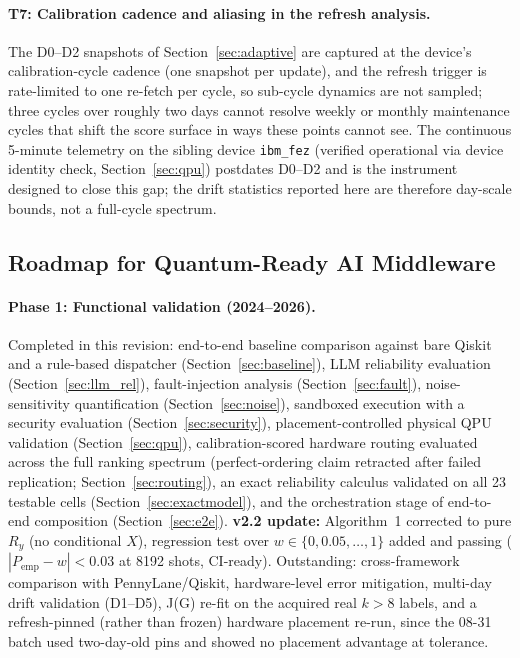 ﻿\documentclass[12pt,a4paper]{article}
\begin{document}
\paragraph{T7: Calibration cadence and aliasing in the refresh analysis.} The D0--D2 snapshots of Section~\ref{sec:adaptive} are captured at the device's calibration-cycle cadence (one snapshot per update), and the refresh trigger is rate-limited to one re-fetch per cycle, so sub-cycle dynamics are not sampled; three cycles over roughly two days cannot resolve weekly or monthly maintenance cycles that shift the score surface in ways these points cannot see. The continuous 5-minute telemetry on the sibling device \texttt{ibm\_fez} (verified operational via device identity check, Section~\ref{sec:qpu}) postdates D0--D2 and is the instrument designed to close this gap; the drift statistics reported here are therefore day-scale bounds, not a full-cycle spectrum.

\subsection{Roadmap for Quantum-Ready AI Middleware}\label{sec:roadmap}

\paragraph{Phase 1: Functional validation (2024--2026).} Completed in this revision: end-to-end baseline comparison against bare Qiskit and a rule-based dispatcher (Section~\ref{sec:baseline}), LLM reliability evaluation (Section~\ref{sec:llm_rel}), fault-injection analysis (Section~\ref{sec:fault}), noise-sensitivity quantification (Section~\ref{sec:noise}), sandboxed execution with a security evaluation (Section~\ref{sec:security}), placement-controlled physical QPU validation (Section~\ref{sec:qpu}), calibration-scored hardware routing evaluated across the full ranking spectrum (perfect-ordering claim retracted after failed replication; Section~\ref{sec:routing}), an exact reliability calculus validated on all 23 testable cells (Section~\ref{sec:exactmodel}), and the orchestration stage of end-to-end composition (Section~\ref{sec:e2e}). \textbf{v2.2 update:} Algorithm~1 corrected to pure $R_y$ (no conditional $X$), regression test over $w\in\{0,0.05,\ldots,1\}$ added and passing ($|P_{\mathrm{emp}}-w|<0.03$ at 8192 shots, CI-ready). Outstanding: cross-framework comparison with PennyLane/Qiskit, hardware-level error mitigation, multi-day drift validation (D1--D5), J(G) re-fit on the acquired real $k{>}8$ labels, and a refresh-pinned (rather than frozen) hardware placement re-run, since the 08-31 batch used two-day-old pins and showed no placement advantage at tolerance.
\end{document}
